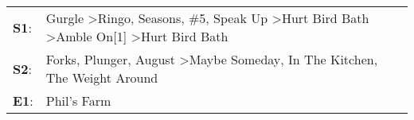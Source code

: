 \begin{supertabular}{p{0.03\textwidth}p{0.92\textwidth}}
 \textbf{S1}:  &  Gurgle\textsuperscript{} \textgreater \enspace Ringo\textsuperscript{}, \enspace Seasons\textsuperscript{}, \enspace \#5\textsuperscript{}, \enspace Speak Up\textsuperscript{} \textgreater \enspace Hurt Bird Bath\textsuperscript{} \textgreater \enspace Amble On[1]\textsuperscript{} \textgreater \enspace Hurt Bird Bath\textsuperscript{}  \enspace  \\
 \textbf{S2}:  &                                                                                                      Forks\textsuperscript{}, \enspace Plunger\textsuperscript{}, \enspace August\textsuperscript{} \textgreater \enspace Maybe Someday\textsuperscript{}, \enspace In The Kitchen\textsuperscript{}, \enspace The Weight Around\textsuperscript{}  \enspace  \\
 \textbf{E1}:  &                                                                                                                                                                                                                                                                                                                      Phil's Farm\textsuperscript{}  \enspace  \\
\end{supertabular}
